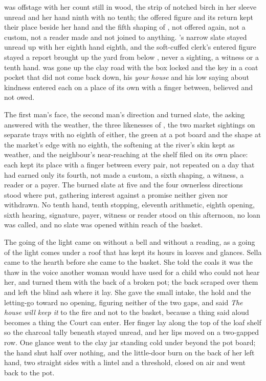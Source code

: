  was offstage with her count still in wood, the strip of notched birch in her sleeve unread and her hand ninth with no tenth; the offered figure and its return kept their place beside her hand and the fifth shaping of , not offered again, not a custom, not a reader made and not joined to anything. 's narrow slate stayed unread up  with her eighth hand eighth, and the soft-cuffed clerk's entered figure stayed a report brought up the yard from  below , never a sighting, a witness or a tenth hand.  was gone up the clay road with the box locked and the key in a coat pocket that did not come back down, his \emph{your house} and his low saying about kindness entered each on a place of its own with a finger between, believed and not owed.

The first man's face, the second man's direction and turned slate, the asking answered with the weather, the three likenesses of , the two market sightings on separate trays with no eighth of either, the green at a pot board and the shape at the market's edge with no eighth, the softening at the river's skin kept as weather, and the neighbour's near-reaching at the shelf filed on its own place: each kept its place with a finger between every pair, not repeated on a day that had earned only its fourth, not made a custom, a sixth shaping, a witness, a reader or a payer. The burned slate at five and the four ownerless directions stood where put, gathering interest against a promise neither given nor withdrawn. No tenth hand, tenth stopping, eleventh arithmetic, eighth opening, sixth hearing, signature, payer, witness or reader stood on this afternoon, no loan was called, and no slate was opened within reach of the basket.

\scenebreak

The going of the light came on without a bell and without a reading, as a going of the light comes under a roof that has kept its hours in loaves and glances. Sella came to the hearth before she came to the basket. She told the coals it was the thaw in the voice another woman would have used for a child who could not hear her, and turned them with the back of a broken pot; the back scraped over them and left the blind ash where it lay. She gave the small intake, the hold and the letting-go toward no opening, figuring neither of the two gaps, and said \emph{The house will keep it} to the fire and not to the basket, because a thing said aloud becomes a thing the Court can enter. Her finger lay along the top of the loaf shelf so the charcoal tally beneath stayed unread, and her lips moved on a two-gapped row. One glance went to the clay jar standing cold under  beyond the pot board; the hand shut half over nothing, and the little-door burn on the back of her left hand, two straight sides with a lintel and a threshold, closed on air and went back to the pot.

